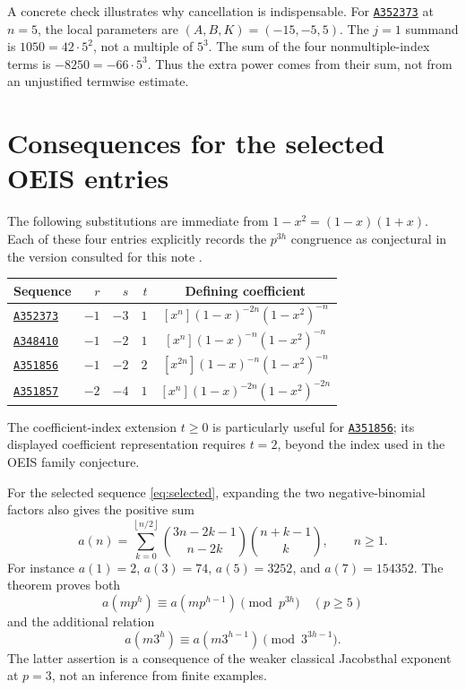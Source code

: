 \documentclass[11pt,a4paper]{article}
\numberwithin{equation}{section}
\theoremstyle{research}
\theoremstyle{definition}
\newcommand{\floor}[1]{\left\lfloor #1\right\rfloor}
\newcommand{\oeis}[1]{\href{https://oeis.org/#1}{\texttt{#1}}}
\begin{document}
A concrete check illustrates why cancellation is indispensable. For
\oeis{A352373} at $n=5$, the local parameters are
$(A,B,K)=(-15,-5,5)$. The $j=1$ summand is $1050=42\cdot5^2$,
not a multiple of $5^3$. The sum of the four nonmultiple-index terms is
$-8250=-66\cdot5^3$. Thus the extra power comes from their sum, not
from an unjustified termwise estimate.

\section{Consequences for the selected OEIS entries}
\label{sec:oeis}
The following substitutions are immediate from $1-x^2=(1-x)(1+x)$.
Each of these four entries explicitly records the $p^{3h}$
congruence as conjectural in the version consulted for this note
\cite{A352373,A348410,A351856,A351857}.
\begin{center}
\renewcommand{\arraystretch}{1.16}
\begin{tabular}{@{}lrrrc@{}}
\toprule
Sequence & $r$ & $s$ & $t$ & Defining coefficient \\
\midrule
\oeis{A352373} & $-1$ & $-3$ & $1$ & $[x^n](1-x)^{-2n}(1-x^2)^{-n}$ \\
\oeis{A348410} & $-1$ & $-2$ & $1$ & $[x^n](1-x)^{-n}(1-x^2)^{-n}$ \\
\oeis{A351856} & $-1$ & $-2$ & $2$ & $[x^{2n}](1-x)^{-n}(1-x^2)^{-n}$ \\
\oeis{A351857} & $-2$ & $-4$ & $1$ & $[x^n](1-x)^{-2n}(1-x^2)^{-2n}$ \\
\bottomrule
\end{tabular}
\end{center}
The coefficient-index extension $t\ge0$ is particularly useful for
\oeis{A351856}; its displayed coefficient representation requires $t=2$, beyond the
index used in the OEIS family conjecture.

For the selected sequence \eqref{eq:selected}, expanding the two
negative-binomial factors also gives the positive sum
\begin{equation}\label{eq:positivesum}
 a(n)=\sum_{k=0}^{\floor{n/2}}
       \binom{3n-2k-1}{n-2k}\binom{n+k-1}{k},\qquad n\ge1.
\end{equation}
For instance $a(1)=2$, $a(3)=74$, $a(5)=3252$, and $a(7)=154352$.
The theorem proves both
\[
 a(mp^h)\equiv a(mp^{h-1})\pmod{p^{3h}}\quad(p\ge5)
\]
and the additional relation
\[
 a(m3^h)\equiv a(m3^{h-1})\pmod{3^{3h-1}}.
\]
The latter assertion is a consequence of the weaker classical
Jacobsthal exponent at $p=3$, not an inference from finite examples.
\end{document}
